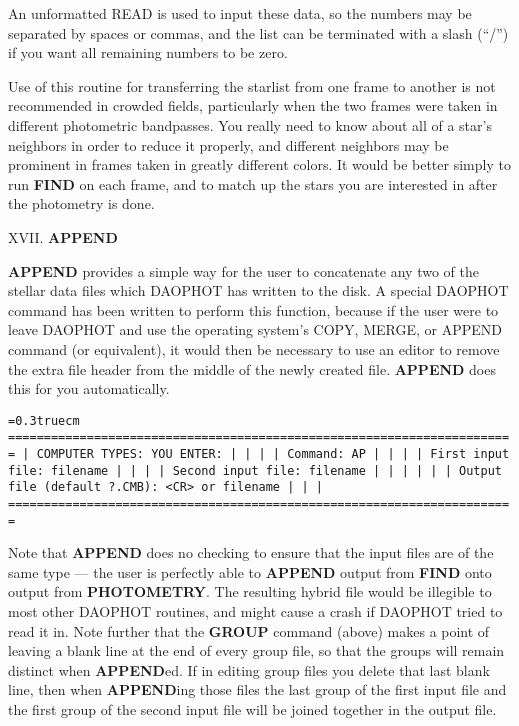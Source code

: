 An unformatted READ is used to input these data, so the numbers may be
separated by spaces or commas, and the list can be terminated with a
slash (``/'') if you want all remaining numbers to be zero.

Use of this routine for transferring the starlist from one frame to
another is not recommended in crowded fields, particularly when the two
frames were taken in different photometric bandpasses.  You really need
to know about all of a star's neighbors in order to reduce it properly,
and different neighbors may be prominent in frames taken in greatly
different colors.  It would be better simply to run {\bf FIND} on each
frame, and to match up the stars you are interested in after the
photometry is done.

\vfill
\eject
\noindent XVII.  {\bf APPEND}

{\bf APPEND} provides a simple way for the user to concatenate any two
of the stellar data files which DAOPHOT has written to the disk.  A
special DAOPHOT command has been written to perform this function,
because if the user were to leave DAOPHOT and use the operating
system's COPY, MERGE, or APPEND command (or equivalent), it would then
be necessary to use an editor to remove the extra file header from the
middle of the newly created file. {\bf APPEND} does this for you
automatically.

\bigskip
{\noindent\obeylines\obeyspaces\frenchspacing\tt\baselineskip=0.3truecm
=======================================================================
| COMPUTER TYPES:                                  YOU ENTER:         |
|                                                                     |
| Command:                                         AP                 |
|                                                                     |
|                   First input file:              filename           |
|                                                                     |
|                  Second input file:              filename           |
|                                                                     |
|                                                                     |
|        Output file (default ?.CMB):              <CR> or filename   |
|                                                                     |
=======================================================================
}
\bigskip

\noindent Note that {\bf APPEND} does no checking to ensure that the
input files are of the same type ---  the user is perfectly able to
{\bf APPEND} output from {\bf FIND} onto output from {\bf PHOTOMETRY}.
The resulting hybrid file would be illegible to most other DAOPHOT
routines, and might cause a crash if DAOPHOT tried to read it in.  Note
further that the {\bf GROUP} command (above) makes a point of leaving a
blank line at the end of every group file, so that the groups will
remain distinct when {\bf APPEND}ed.  If in editing group files you
delete that last blank line, then when {\bf APPEND}ing those files the
last group of the first input file and the first group of the second
input file will be joined together in the output file.

